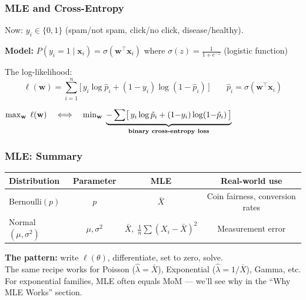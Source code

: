 \documentclass[aspectratio=169]{beamer}
\begin{document}
\begin{frame}
\frametitle{MLE and Cross-Entropy}

\small
Now: $y_i \in \{0,1\}$ \;\;(spam/not spam, click/no click, disease/healthy).

\vspace{0.15cm}
\textbf{Model:} \;$P(y_i = 1 \mid \mathbf{x}_i) = \sigma(\mathbf{w}^\top\!\mathbf{x}_i)$
\;\;where \;$\sigma(z) = \frac{1}{1 + e^{-z}}$ \;\;(logistic function)

\vspace{0.15cm}\pause
The log-likelihood:
\vspace{-0.15cm}
$$\ell(\mathbf{w}) = \sum_{i=1}^n \bigl[\, y_i \log \hat{p}_i + (1{-}y_i)\log(1{-}\hat{p}_i)\,\bigr] \qquad \hat{p}_i = \sigma(\mathbf{w}^\top\!\mathbf{x}_i)$$

\vspace{-0.25cm}\pause
\begin{center}
$\max_{\mathbf{w}}\;\ell(\mathbf{w}) \quad\Longleftrightarrow\quad \min_{\mathbf{w}} \;\underbrace{-\sum \bigl[\, y_i \log \hat{p}_i + (1{-}y_i)\log(1{-}\hat{p}_i)\,\bigr]}_{\text{\textbf{binary cross-entropy loss}}}$
\end{center}

\vspace{0.1cm}
\begin{center}
\end{center}
\end{frame}

\begin{frame}
\frametitle{MLE: Summary}

\begin{center}
\renewcommand{\arraystretch}{1.8}
\begin{tabular}{lccc}
  \textbf{Distribution} & \textbf{Parameter} & \textbf{MLE} & \textbf{Real-world use} \\
  \hline
  Bernoulli$(p)$ & $p$ & $\bar{X}$ & Coin fairness, conversion rates \\
  Normal$(\mu, \sigma^2)$ & $\mu, \sigma^2$ & $\bar{X}, \;\frac{1}{n}\sum(X_i-\bar{X})^2$ & Measurement error \\
  \hline
\end{tabular}
\end{center}

\vspace{0.3cm}
\small
\textbf{The pattern:} write $\ell(\theta)$, differentiate, set to zero, solve.\\[6pt]
The same recipe works for Poisson ($\hat\lambda = \bar{X}$), Exponential ($\hat\lambda = 1/\bar{X}$), Gamma, etc.\\[6pt]
For exponential families, MLE often equals MoM --- we'll see why in the ``Why MLE Works'' section.
\end{frame}
\end{document}
